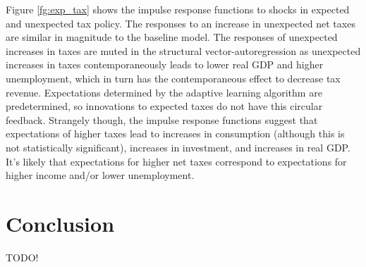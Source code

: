 \documentclass[12pt]{article}
\begin{document}
Figure \ref{fg:exp_tax} shows the impulse response functions to shocks in expected and unexpected tax policy.  The responses to an increase in unexpected net taxes are similar in magnitude to the baseline model.  The responses of unexpected increases in taxes are muted in the structural vector-autoregression as unexpected increases in taxes contemporaneously leads to lower real GDP and higher unemployment, which in turn has the contemporaneous effect to decrease tax revenue.  Expectations determined by the adaptive learning algorithm are predetermined, so innovations to expected taxes do not have this circular feedback.  Strangely though, the impulse response functions suggest that expectations of higher taxes lead to increases in consumption (although this is not statistically significant), increases in investment, and increases in real GDP.  It's likely that expectations for higher net taxes correspond to expectations for higher income and/or lower unemployment.

\section{Conclusion}

TODO!

\newpage
\nocite{*}


\newpage
\end{document}
